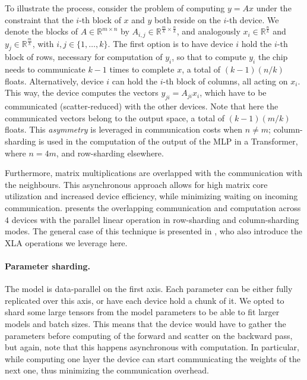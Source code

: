 To illustrate the process, consider the problem of computing $y=Ax$ under the constraint that the $i$-th block of $x$ and $y$ both reside  on the $i$-th device. We denote the blocks of $A\in\mathbb{R}^{m\times n}$ by $A_{i,j}\in\mathbb{R}^{\frac{m}{k}\times\frac{n}{k}}$, and analogously $x_i\in\mathbb{R}^{\frac{n}{k}}$ and  $y_j\in\mathbb{R}^{\frac{m}{k}}$, with $i,j\in\{1,\ldots,k\}$.
The first option is to have device $i$ hold the $i$-th block of rows, necessary for computation of $y_i$, so that to compute $y_i$ the chip needs to communicate $k-1$ times to complete $x$, a total of $(k-1)(n/k)$ floats.
Alternatively, device $i$ can hold the $i$-th block of columns, all acting on $x_i$.
This way, the device computes the vectors $y_{ji}=A_{ji}x_i$, which have to be communicated (scatter-reduced) with the other devices.
Note that here the communicated vectors belong to the output space, a total of $(k-1)(m/k)$ floats.
This \emph{asymmetry} is leveraged in communication costs when $n\neq m$; column-sharding is used in the computation of the output of the MLP in a Transformer, where $n=4m$, and row-sharding elsewhere.

Furthermore, matrix multiplications are overlapped with the communication with the neighbours.
This asynchronous approach allows for high matrix core utilization and increased device efficiency, while minimizing waiting on incoming communication.
 presents the overlapping communication and computation across $4$ devices with the parallel linear operation in row-sharding and column-sharding modes.
The general case of this technique is presented in \citet{wang2022overlap}, who
also introduce the XLA operations we leverage here.

\paragraph{Parameter sharding.}
The model is data-parallel on the first axis.
Each parameter can be either fully replicated over this axis, or have each device hold a chunk of it.
We opted to shard some large tensors from the model parameters to be able to fit larger models and batch sizes.
This means that the device would have to gather the parameters before computing of the forward and scatter on the backward pass, but again, note that this happens asynchronous with computation.
In particular, while computing one layer the device can start communicating the weights of the next one, thus minimizing the communication overhead.



